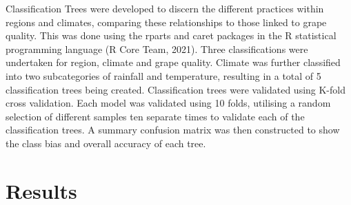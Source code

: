 \documentclass[review,12pt,authoryear]{elsarticle}
\begin{document}
\begin{linenumbers}
Classification Trees were developed to discern the different practices within regions and climates, 
comparing these relationships to those linked to grape quality. This was done using the rparts and caret packages \autocite{kuhnBuildingPredictiveModels2008,terrytherneauRpartRecursivePartitioning2022} in the R statistical programming language (R Core Team, 2021). 
\newline
Three classifications were undertaken for region, climate and grape quality.
Climate was further classified into two subcategories of rainfall and temperature,
resulting in a total of 5 classification trees being created. %
Classification trees were validated using K-fold cross validation.%
 Each model was validated using 10 folds, utilising a random selection of different samples ten separate times to validate each of the  classification trees. A summary confusion matrix was then constructed to show the class bias and overall accuracy of each tree.



\section{Results}


\end{linenumbers}
\end{document}
